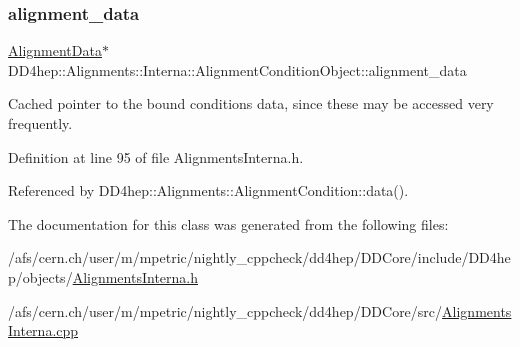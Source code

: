 \subsubsection{\texorpdfstring{alignment\+\_\+data}{alignment\_data}}
{\footnotesize\ttfamily \hyperlink{class_d_d4hep_1_1_alignments_1_1_alignment_data}{Alignment\+Data}$\ast$ D\+D4hep\+::\+Alignments\+::\+Interna\+::\+Alignment\+Condition\+Object\+::alignment\+\_\+data}



Cached pointer to the bound conditions data, since these may be accessed very frequently. 



Definition at line 95 of file Alignments\+Interna.\+h.



Referenced by D\+D4hep\+::\+Alignments\+::\+Alignment\+Condition\+::data().



The documentation for this class was generated from the following files\+:\begin{DoxyCompactItemize}
\item 
/afs/cern.\+ch/user/m/mpetric/nightly\+\_\+cppcheck/dd4hep/\+D\+D\+Core/include/\+D\+D4hep/objects/\hyperlink{_alignments_interna_8h}{Alignments\+Interna.\+h}\item 
/afs/cern.\+ch/user/m/mpetric/nightly\+\_\+cppcheck/dd4hep/\+D\+D\+Core/src/\hyperlink{_alignments_interna_8cpp}{Alignments\+Interna.\+cpp}\end{DoxyCompactItemize}
